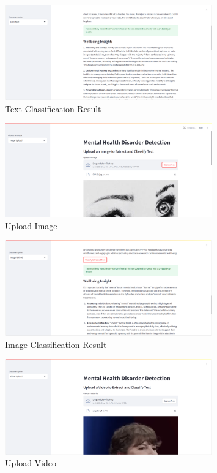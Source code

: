 \begin{figure}[h!]  
    \centering
    \includegraphics[width=0.8\textwidth]{App Images/03 Interface.png}  
    \caption{Text Classification Result}
    \label{03i}  %
\end{figure}



\begin{figure}[h!]  
    \centering
    \includegraphics[width=0.8\textwidth]{App Images/04 Interface.png}  
    \caption{Upload Image}
    \label{04i}  %
\end{figure}

\pagebreak

\begin{figure}[h!]  
    \centering
    \includegraphics[width=0.8\textwidth]{App Images/05 Interface.png}  
    \caption{Image Classification Result}
    \label{05i}  %
\end{figure}


\begin{figure}[h!]  
    \centering
    \includegraphics[width=0.8\textwidth]{App Images/12 Interface.png}  
    \caption{Upload Video}
    \label{06i4}  %
\end{figure}

